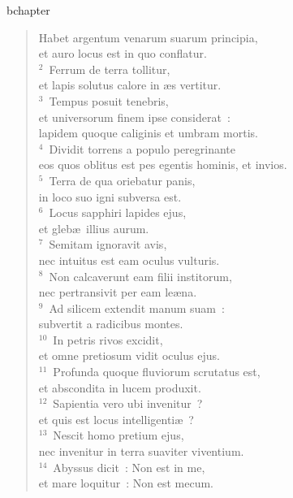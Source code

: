 bchapter\begin{flushleft}\begin{verse}\vspace{-19pt}\hspace{6pt}Habet argentum venarum suarum principia,\\\hspace{6pt} et auro locus est in quo conflatur.\\
${}^{2}$~Ferrum de terra tollitur,\\ et lapis solutus calore in \ae s vertitur.\\
${}^{3}$~Tempus posuit tenebris,\\ et universorum finem ipse considerat~:\\ lapidem quoque caliginis et umbram mortis.\\
${}^{4}$~Dividit torrens a populo peregrinante\\ eos quos oblitus est pes egentis hominis, et invios.\\
${}^{5}$~Terra de qua oriebatur panis,\\ in loco suo igni subversa est.\\
${}^{6}$~Locus sapphiri lapides ejus,\\ et gleb\ae\ illius aurum.\\
${}^{7}$~Semitam ignoravit avis,\\ nec intuitus est eam oculus vulturis.\\
${}^{8}$~Non calcaverunt eam filii institorum,\\ nec pertransivit per eam le\ae na.\\
${}^{9}$~Ad silicem extendit manum suam~:\\ subvertit a radicibus montes.\\
${}^{10}$~In petris rivos excidit,\\ et omne pretiosum vidit oculus ejus.\\
${}^{11}$~Profunda quoque fluviorum scrutatus est,\\ et abscondita in lucem produxit.\\
${}^{12}$~Sapientia vero ubi invenitur~?\\ et quis est locus intelligenti\ae~?\\
${}^{13}$~Nescit homo pretium ejus,\\ nec invenitur in terra suaviter viventium.\\
${}^{14}$~Abyssus dicit~: Non est in me,\\ et mare loquitur~: Non est mecum.\\

\end{verse}
\end{flushleft}
